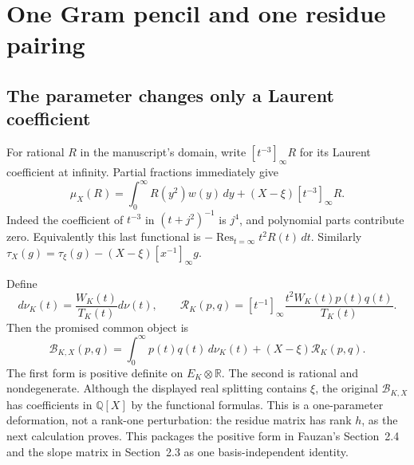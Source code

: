 \documentclass[11pt]{article}
\theoremstyle{definition}
\theoremstyle{remark}\newtheorem*{remark}{Remark}
\newcommand{\Q}{\mathbb Q}
\newcommand{\R}{\mathbb R}
\newcommand{\Res}{\operatorname{Res}}
\newcommand{\dd}{\,d}
\newcommand{\pair}{\mathcal B}
\newcommand{\rpair}{\mathcal R}
\begin{document}
\section{One Gram pencil and one residue pairing}

\subsection{The parameter changes only a Laurent coefficient}
For rational $R$ in the manuscript's domain, write $[t^{-3}]_\infty R$ for its
Laurent coefficient at infinity. Partial fractions immediately give
\begin{equation}\label{eq:mastermu}
 \boxed{\displaystyle
 \mu_X(R)=\int_0^\infty R(y^2)w(y)\dd y
             +(X-\xi)[t^{-3}]_\infty R.}
\end{equation}
Indeed the coefficient of $t^{-3}$ in $(t+j^2)^{-1}$ is $j^4$, and polynomial
parts contribute zero. Equivalently this last functional is
$-\Res_{t=\infty}t^2R(t)\dd t$.
Similarly $\tau_X(g)=\tau_\xi(g)-(X-\xi)[x^{-1}]_\infty g$.

Define
\[
 d\nu_K(t)=\frac{W_K(t)}{T_K(t)}d\nu(t),\qquad
 \rpair_K(p,q)=[t^{-1}]_\infty\frac{t^2W_K(t)p(t)q(t)}{T_K(t)}.
\]
Then the promised common object is
\begin{equation}\label{eq:masterform}
 \boxed{\displaystyle
 \pair_{K,X}(p,q)=\int_0^\infty p(t)q(t)\,d\nu_K(t)
                     +(X-\xi)\rpair_K(p,q).}
\end{equation}
The first form is positive definite on $E_K\otimes\R$. The second is rational
and nondegenerate. Although the displayed real splitting contains $\xi$, the
original $\pair_{K,X}$ has coefficients in $\Q[X]$ by the functional formulas.
This is a one-parameter deformation, not a rank-one perturbation: the residue
matrix has rank $h$, as the next calculation proves.
This packages the positive form in Fauzan's Section~2.4 and the slope matrix
in Section~2.3 as one basis-independent identity.
\end{document}
